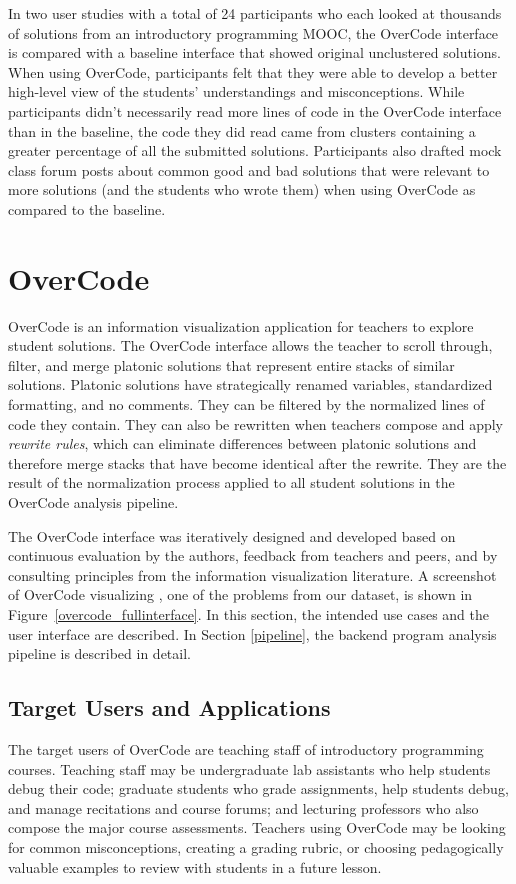 In two user studies with a total of 24 participants who each looked at thousands of solutions from an introductory programming MOOC, the OverCode interface is compared with a baseline interface that showed original unclustered solutions. When using OverCode, participants felt that they were able to develop a better high-level view of the students' understandings and misconceptions. While participants didn't necessarily read more lines of code in the OverCode interface than in the baseline, the code they did read came from clusters containing a greater percentage of all the submitted solutions. Participants also drafted mock class forum posts about common good and bad solutions that were relevant to more solutions (and the students who wrote them) when using OverCode as compared to the baseline. 

\section{OverCode} \label{overcode}
OverCode is an information visualization application for teachers to explore student solutions. The OverCode interface allows the teacher to scroll through, filter, and merge platonic solutions that represent entire stacks of similar solutions. Platonic solutions have strategically renamed variables, standardized formatting, and no comments. They can be filtered by the normalized lines of code they contain. They can also be rewritten when teachers compose and apply \emph{rewrite rules}, which can eliminate differences between platonic solutions and therefore merge stacks that have become identical after the rewrite. They are the result of the normalization process applied to all student solutions in the OverCode analysis pipeline. 

The OverCode interface was iteratively designed and developed based on continuous evaluation by the authors, feedback from teachers and peers, and by consulting principles from the information visualization literature. A screenshot of OverCode visualizing , one of the problems from our dataset, is shown in Figure~\ref{overcode_fullinterface}. In this section, the intended use cases and the user interface are described. In Section \ref{pipeline}, the backend program analysis pipeline is described in detail. 
\subsection{Target Users and Applications}
The target users of OverCode are teaching staff of introductory programming courses. Teaching staff may be undergraduate lab assistants who help students debug their code; graduate students who grade assignments, help students debug, and manage recitations and course forums; and lecturing professors who also compose the major course assessments. Teachers using OverCode may be looking for common misconceptions, creating a grading rubric, or choosing pedagogically valuable examples to review with students in a future lesson.

